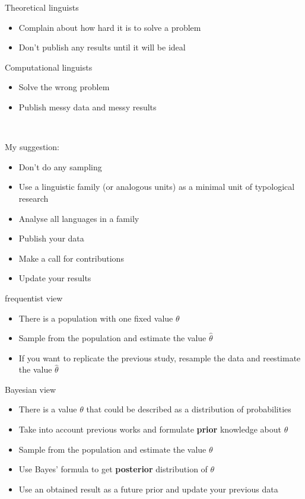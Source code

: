 \documentclass[13pt, t]{beamer}
\begin{document}
\begin{frame}
\begin{multicols}{2}
Theoretical linguists
\begin{itemize}
\item Complain about how hard it is to solve a problem
\item Don't publish any results until it will be ideal
\end{itemize}
\columnbreak
Computational linguists
\begin{itemize}
\item Solve the wrong problem
\item Publish messy data and messy results
\end{itemize}
\vfill
\ \pause
\end{multicols}
My suggestion: 
\begin{itemize}
\item Don't do any sampling
\item Use a linguistic family (or analogous units) as a minimal unit of typological research
\item Analyse all languages in a family
\item Publish your data
\item Make a call for contributions
\item Update your results
\end{itemize}
\end{frame}

\begin{frame}
\begin{multicols}{2}
frequentist view
\begin{itemize}
\item There is a population with one fixed value $\theta$
\item Sample from the population and estimate the value $\hat{\theta}$
\item If you want to replicate the previous study, resample the data and reestimate the value $\hat{\theta}$
\vfill
\
\end{itemize}
\columnbreak
Bayesian view
\begin{itemize}
\item There is a value $\theta$ that could be described as a distribution of probabilities
\item Take into account previous works and formulate \textbf{prior} knowledge about $\theta$
\item Sample from the population and estimate the value $\theta$
\item Use Bayes' formula to get \textbf{posterior} distribution of $\theta$
\item Use an obtained result as a future prior and update your previous data
\end{itemize}
\end{multicols}
\end{frame}
\end{document}

